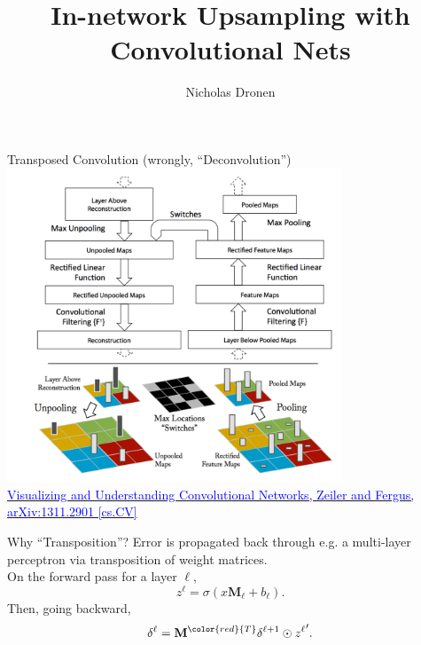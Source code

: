 \documentclass[]{beamer}
\begin{document}

\title{In-network Upsampling with Convolutional Nets}
\author{Nicholas Dronen}


\begin{frame}
\maketitle
\end{frame}


\begin{frame}{Transposed Convolution (wrongly, ``Deconvolution'')}
\centering
\includegraphics[width=0.75\textwidth]{figures/zeiler-transposed} \\
\href{https://arxiv.org/abs/1311.2901}
{\textcolor{blue}{Visualizing and Understanding Convolutional Networks, Zeiler and Fergus, arXiv:1311.2901 [cs.CV]}}
\end{frame}


\begin{frame}{Why ``Transposition''?}
Error is propagated back through e.g. a multi-layer perceptron via transposition of weight matrices. \\
\vspace{2mm}
\centering
On the forward pass for a layer $\ell$,
\begin{equation*}
z^{\ell} = \sigma(x\mathbf{M}_{\ell} + b_{\ell}).
\end{equation*}
Then, going backward, 
\centering
\begin{equation*}
\delta^{\ell} = \mathbf{M}^{\color{red}{T}} \delta^{\ell+1} \odot {z^{\ell}}^{\prime}.
\end{equation*}
\end{frame}
\end{document}
